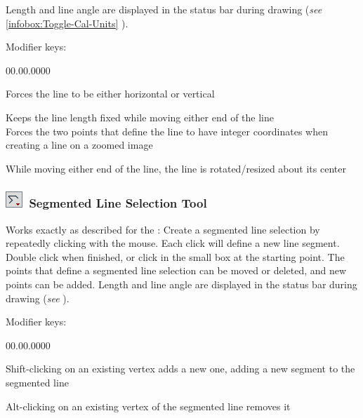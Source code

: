Length
and line angle are displayed in the status bar during drawing (\emph{see}
\ref{infobox:Toggle-Cal-Units} ). 

\noindent Modifier keys:
\begin{lyxlist}{00.00.0000}
\item [{\mykeystroke{Shift}}] \noindent Forces the line to be either horizontal
or vertical
\item [{\mykeystroke{Alt}}] \noindent Keeps the line length fixed while
moving either end of the line\\
Forces the two points that define the line to have integer coordinates
when creating a line on a zoomed image
\item [{\mykeystroke{Ctrl}}] \noindent While moving either end of the
line, the line is rotated/resized about its center
\end{lyxlist}



\subsubsection[Segmented Line Selection Tool]{\protect\includegraphics[bb=0bp 5bp 20bp 20bp,scale=0.6]{images/tools/SegLine}~Segmented
Line Selection Tool\label{sub:Segmented-Line-Selection}\improvement{}}

Works exactly as described for the :
Create a segmented line selection by repeatedly clicking with the
mouse. Each click will define a new line segment. Double click when
finished, or click in the small box at the starting point. The points
that define a segmented line selection can be moved or deleted, and
new points can be added. Length and line angle are displayed in the
status bar during drawing (\emph{see} ). 

Modifier keys:
\begin{lyxlist}{00.00.0000}
\item [{\mykeystroke{Shift}}] \noindent Shift-clicking on an existing
vertex adds a new one, adding a new segment to the segmented line
\item [{\mykeystroke{Alt}}] \noindent Alt-clicking on an existing vertex
of the segmented line removes it
\end{lyxlist}

